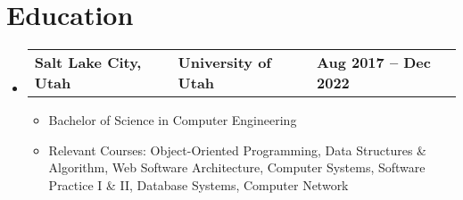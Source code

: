 \documentclass[letterpaper,11pt]{article}
\begin{document}

\section{\textbf{Education}}
\begin{itemize}[leftmargin=0.15in, itemsep=0pt, parsep=0pt, label={}]
	\item{
	            \begin{tabu} to \dimexpr\textwidth-0.15in {X[l] X[c] X[r]}
		            \textbf{Salt Lake City, Utah} & \textbf{University of Utah} & \textbf{Aug 2017 -- Dec 2022} \\
	            \end{tabu}

	            \begin{itemize} [label=$\bullet$]
		            \item{Bachelor of Science in Computer Engineering}
		            \item{Relevant Courses{: Object-Oriented Programming, Data Structures \& Algorithm, Web Software Architecture, Computer Systems, Software Practice I \& II, Database Systems, Computer Network} }
	            \end{itemize}
	      }
\end{itemize}


\end{document}
